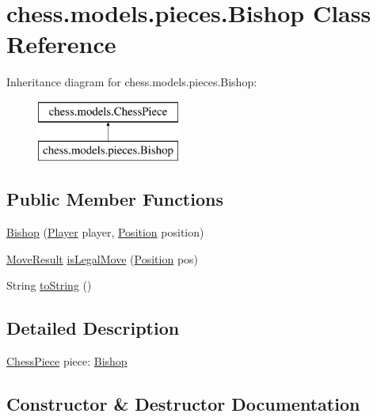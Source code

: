 \hypertarget{classchess_1_1models_1_1pieces_1_1_bishop}{}\section{chess.\+models.\+pieces.\+Bishop Class Reference}
\label{classchess_1_1models_1_1pieces_1_1_bishop}
Inheritance diagram for chess.\+models.\+pieces.\+Bishop\+:\begin{figure}[H]
\begin{center}
\leavevmode
\includegraphics[height=2.000000cm]{classchess_1_1models_1_1pieces_1_1_bishop}
\end{center}
\end{figure}
\subsection*{Public Member Functions}
\begin{DoxyCompactItemize}
\item 
\mbox{\hyperlink{classchess_1_1models_1_1pieces_1_1_bishop_a9abc7cf53fde3e6ec5f8af6fbc7b005d}{Bishop}} (\mbox{\hyperlink{enumchess_1_1models_1_1enums_1_1_player}{Player}} player, \mbox{\hyperlink{classchess_1_1models_1_1_position}{Position}} position)
\item 
\mbox{\hyperlink{enumchess_1_1models_1_1enums_1_1_move_result}{Move\+Result}} \mbox{\hyperlink{classchess_1_1models_1_1pieces_1_1_bishop_ae5a545cda22d44b4c4cbfeebab5c0853}{is\+Legal\+Move}} (\mbox{\hyperlink{classchess_1_1models_1_1_position}{Position}} pos)
\item 
String \mbox{\hyperlink{classchess_1_1models_1_1pieces_1_1_bishop_abbdf19ca47acb189eeaa49931eb2f30c}{to\+String}} ()
\end{DoxyCompactItemize}


\subsection{Detailed Description}
\mbox{\hyperlink{classchess_1_1models_1_1_chess_piece}{Chess\+Piece}} piece\+: \mbox{\hyperlink{classchess_1_1models_1_1pieces_1_1_bishop}{Bishop}} 

\subsection{Constructor \& Destructor Documentation}
\mbox{\label{classchess_1_1models_1_1pieces_1_1_bishop_a9abc7cf53fde3e6ec5f8af6fbc7b005d}} 
